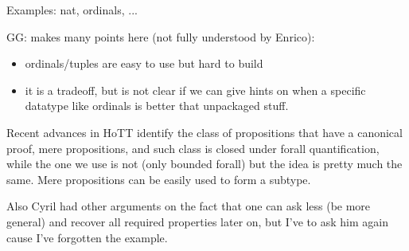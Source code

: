 \mcbREQUIRE{}


Examples: nat, ordinals, ...

GG: makes many points here (not fully understood by Enrico):
\begin{itemize}
\item ordinals/tuples are easy to use but hard to build
\item it is a tradeoff, but is not clear if we can give hints on when
	a specific datatype like ordinals is better that unpackaged
	stuff.
\end{itemize}

\mcbPROVIDE{}
\mcbREQUIRE{}

Recent advances in HoTT identify the class of propositions that have a
canonical proof, mere propositions, and such class is closed under
forall quantification, while the one we use is not (only bounded
forall) but the idea is pretty much the same.  Mere propositions can
be easily used to form a subtype.

Also Cyril had other arguments on the fact that one can
ask less (be more general) and recover all required properties later
on, but I've to ask him again cause I've forgotten the example.
